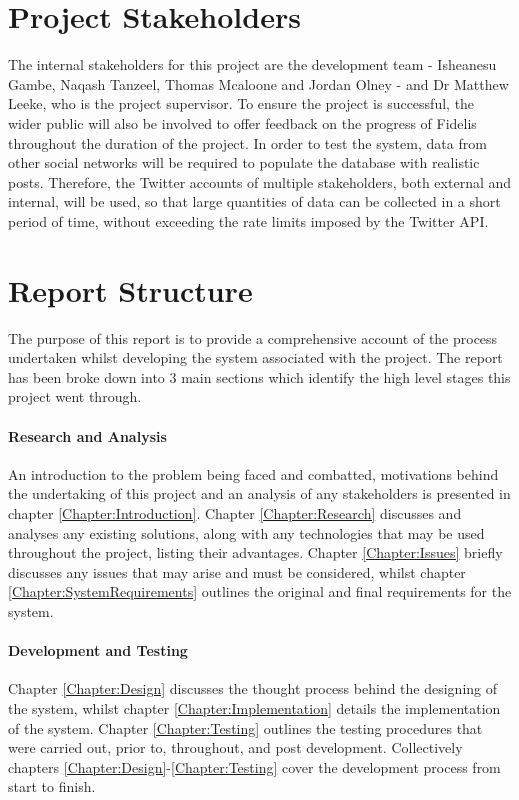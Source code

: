 \section{Project Stakeholders}
The internal stakeholders for this project are the development team - Isheanesu Gambe, Naqash Tanzeel, Thomas Mcaloone and Jordan Olney - and Dr Matthew Leeke, who is the project supervisor. To ensure the project is successful, the wider public will also be involved to offer feedback on the progress of Fidelis throughout the duration of the project. In order to test the system, data from other social networks will be required to populate the database with realistic posts. Therefore, the Twitter accounts of multiple stakeholders, both external and internal, will be used, so that large quantities of data can be collected in a short period of time, without exceeding the rate limits imposed by the Twitter API.

\section{Report Structure}
The purpose of this report is to provide a comprehensive account of the process undertaken whilst developing the system associated with the project. The report has been broke down into 3 main sections which identify the high level stages this project went through.

\paragraph{Research and Analysis}
An introduction to the problem being faced and combatted, motivations behind the undertaking of this project and an analysis of any stakeholders is presented in chapter \ref{Chapter:Introduction}. Chapter \ref{Chapter:Research} discusses and analyses any existing solutions, along with any technologies that may be used throughout the project, listing their advantages. Chapter \ref{Chapter:Issues} briefly discusses any issues that may arise and must be considered, whilst chapter \ref{Chapter:SystemRequirements} outlines the original and final requirements for the system.

\paragraph{Development and Testing}
Chapter \ref{Chapter:Design} discusses the thought process behind the designing of the system, whilst chapter \ref{Chapter:Implementation} details the implementation of the system. Chapter \ref{Chapter:Testing} outlines the testing procedures that were carried out, prior to, throughout, and post development. Collectively chapters \ref{Chapter:Design}-\ref{Chapter:Testing} cover the development process from start to finish.

